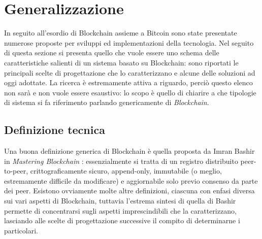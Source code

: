 \section{Generalizzazione}
	In seguito all'esordio di Blockchain assieme a Bitcoin sono state presentate numerose proposte per sviluppi ed implementazioni della tecnologia. Nel seguito di questa sezione si presenta quello che vuole essere uno schema delle caratteristiche salienti di un sistema basato su Blockchain: sono riportati le principali scelte di progettazione che lo caratterizzano e alcune delle soluzioni ad oggi adottate. La ricerca è estremamente attiva a riguardo, perciò questo elenco non sarà e non vuole essere esaustivo: lo scopo è quello di chiarire a che tipologie di sistema si fa riferimento parlando genericamente di \emph{Blockchain}.
	\subsection{Definizione tecnica}
		Una buona definizione generica di Blockchain è quella proposta da Imran Bashir in \emph{Mastering Blockchain} \cite{mastering_blockchain}: essenzialmente si tratta di un registro distribuito peer-to-peer, crittograficamente sicuro, append-only, immutabile (o meglio, estremamente difficile da modificare) e aggiornabile solo previo consenso da parte dei peer. Esistono ovviamente molte altre definizioni, ciascuna con enfasi diversa sui vari aspetti di Blockchain, tuttavia l'estrema sintesi di quella di Bashir permette di concentrarsi sugli aspetti imprescindibili che la caratterizzano, lasciando alle scelte di progettazione successive il compito di determinarne i particolari.
		
